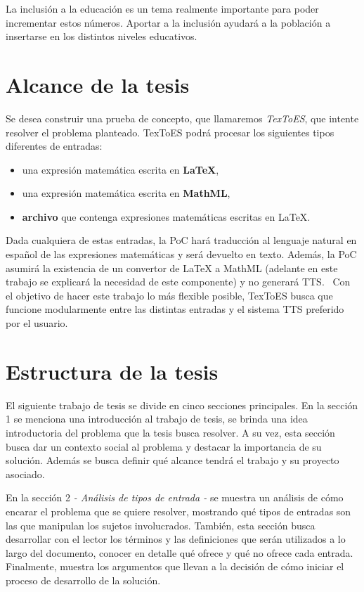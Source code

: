 La inclusión a la educación es un tema realmente importante para poder incrementar estos números. Aportar a la inclusión ayudará a la población
a insertarse en los distintos niveles educativos.


\section{Alcance de la tesis}

Se desea construir una prueba de concepto, que llamaremos \textit{TexToES},  que intente resolver el problema planteado.
TexToES podrá procesar los siguientes tipos diferentes de entradas:
\begin{itemize}
\item una expresión matemática escrita en \textbf{\LaTeX{}},
\item una expresión matemática escrita en \textbf{MathML},
\item \textbf{archivo} que contenga expresiones matemáticas escritas en \LaTeX{}.
\end{itemize}
Dada cualquiera de estas entradas, la PoC hará traducción al lenguaje natural en español de las expresiones matemáticas y será devuelto en texto.
Además, la PoC asumirá la existencia de un convertor de LaTeX a MathML (adelante en este trabajo se explicará la necesidad de este componente) y no generará TTS. \
Con el objetivo de hacer este trabajo lo más flexible posible, TexToES busca que funcione modularmente entre las distintas entradas y el sistema TTS preferido por el usuario.


\section{Estructura de la tesis}

El siguiente trabajo de tesis se divide en cinco secciones principales. En la sección 1  se menciona una introducción al trabajo de tesis, se brinda una idea introductoria del problema que la tesis busca resolver. A su vez, esta sección busca dar un contexto social al problema y destacar la importancia de su solución. Además se busca definir qué alcance tendrá el trabajo y su proyecto asociado.

En la sección 2 \textit{- Análisis de tipos de entrada -} se muestra un análisis de cómo encarar el problema que se quiere resolver, mostrando qué tipos de entradas son las que manipulan los sujetos involucrados. También, esta sección busca desarrollar con el lector los términos y las definiciones que serán utilizados a lo largo del documento, conocer en detalle qué ofrece y qué no ofrece cada entrada. Finalmente, muestra los argumentos que llevan a la decisión de cómo iniciar el proceso de desarrollo de la solución.

